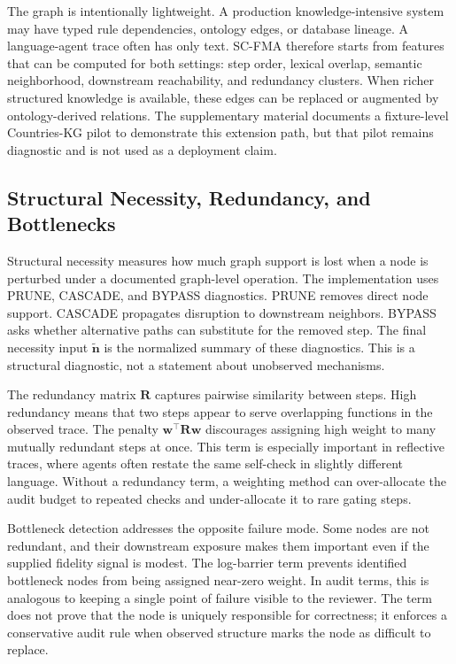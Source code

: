 \documentclass[a4paper,fleqn]{cas-sc}
\begin{document}
The graph is intentionally lightweight. A production knowledge-intensive system may have typed rule dependencies, ontology edges, or database lineage. A language-agent trace often has only text. SC-FMA therefore starts from features that can be computed for both settings: step order, lexical overlap, semantic neighborhood, downstream reachability, and redundancy clusters. When richer structured knowledge is available, these edges can be replaced or augmented by ontology-derived relations. The supplementary material documents a fixture-level Countries-KG pilot to demonstrate this extension path, but that pilot remains diagnostic and is not used as a deployment claim.

\subsection{Structural Necessity, Redundancy, and Bottlenecks}

Structural necessity measures how much graph support is lost when a node is perturbed under a documented graph-level operation. The implementation uses PRUNE, CASCADE, and BYPASS diagnostics. PRUNE removes direct node support. CASCADE propagates disruption to downstream neighbors. BYPASS asks whether alternative paths can substitute for the removed step. The final necessity input $\tilde{\mathbf{n}}$ is the normalized summary of these diagnostics. This is a structural diagnostic, not a statement about unobserved mechanisms.

The redundancy matrix $\mathbf{R}$ captures pairwise similarity between steps. High redundancy means that two steps appear to serve overlapping functions in the observed trace. The penalty $\mathbf{w}^{\top}\mathbf{R}\mathbf{w}$ discourages assigning high weight to many mutually redundant steps at once. This term is especially important in reflective traces, where agents often restate the same self-check in slightly different language. Without a redundancy term, a weighting method can over-allocate the audit budget to repeated checks and under-allocate it to rare gating steps.

Bottleneck detection addresses the opposite failure mode. Some nodes are not redundant, and their downstream exposure makes them important even if the supplied fidelity signal is modest. The log-barrier term prevents identified bottleneck nodes from being assigned near-zero weight. In audit terms, this is analogous to keeping a single point of failure visible to the reviewer. The term does not prove that the node is uniquely responsible for correctness; it enforces a conservative audit rule when observed structure marks the node as difficult to replace.
\end{document}
